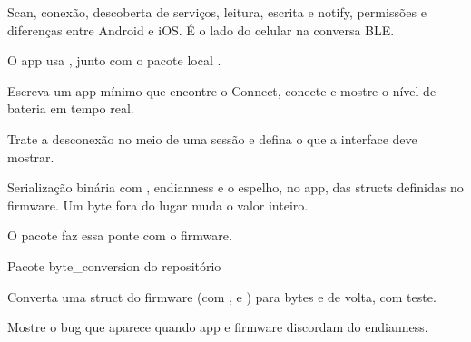 Scan, conexão, descoberta de serviços, leitura, escrita e notify, permissões e diferenças entre Android e iOS. É o lado do celular na conversa BLE.

\begin{noproduto}
O app usa , junto com o pacote local .
\end{noproduto}

\begin{paraestudar}
  \item {}
  \item {}
\end{paraestudar}

\begin{pratique}
  \item Escreva um app mínimo que encontre o Connect, conecte e mostre o nível de bateria em tempo real.
  \item Trate a desconexão no meio de uma sessão e defina o que a interface deve mostrar.
\end{pratique}

Serialização binária com , endianness e o espelho, no app, das structs definidas no firmware. Um byte fora do lugar muda o valor inteiro.

\begin{noproduto}
O pacote  faz essa ponte com o firmware.
\end{noproduto}

\begin{paraestudar}
  \item {}
  \item Pacote byte\_conversion do repositório
\end{paraestudar}

\begin{pratique}
  \item Converta uma struct do firmware (com ,  e ) para bytes e de volta, com teste.
  \item Mostre o bug que aparece quando app e firmware discordam do endianness.
\end{pratique}

